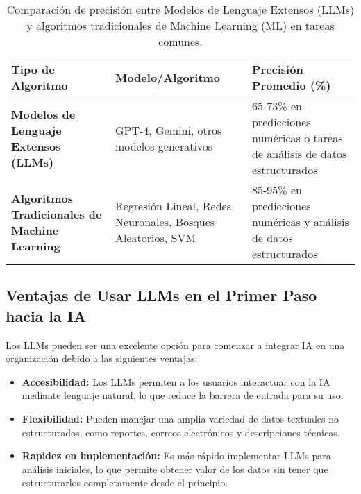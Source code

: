 \begin{table}[htbp]
\centering
\caption{Comparación de precisión entre Modelos de Lenguaje Extensos (LLMs) y algoritmos tradicionales de Machine Learning (ML) en tareas comunes.}
\label{tab:precision-llm-ml}
\begin{tabularx}{\textwidth}{|X|X|X|}
\hline
\textbf{Tipo de Algoritmo} & \textbf{Modelo/Algoritmo} & \textbf{Precisión Promedio (\%)} \\
\hline
\textbf{Modelos de Lenguaje Extensos (LLMs)} & GPT-4, Gemini, otros modelos generativos & 65-73\% en predicciones numéricas o tareas de análisis de datos estructurados \\
\hline
\textbf{Algoritmos Tradicionales de Machine Learning} & Regresión Lineal, Redes Neuronales, Bosques Aleatorios, SVM & 85-95\% en predicciones numéricas y análisis de datos estructurados \\
\hline
\end{tabularx}
\end{table}

\subsection{Ventajas de Usar LLMs en el Primer Paso hacia la IA}
Los LLMs pueden ser una excelente opción para comenzar a integrar IA en una organización debido a las siguientes ventajas:
\begin{itemize}
    \item \textbf{Accesibilidad:} Los LLMs permiten a los usuarios interactuar con la IA mediante lenguaje natural, lo que reduce la barrera de entrada para su uso.
    \item \textbf{Flexibilidad:} Pueden manejar una amplia variedad de datos textuales no estructurados, como reportes, correos electrónicos y descripciones técnicas.
    \item \textbf{Rapidez en implementación:} Es más rápido implementar LLMs para análisis iniciales, lo que permite obtener valor de los datos sin tener que estructurarlos completamente desde el principio.
\end{itemize}

